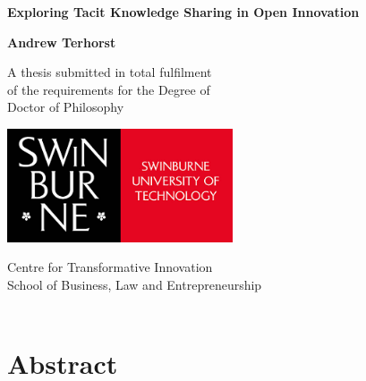 \documentclass[12pt,table,xcdraw]{book}
\renewcommand{\today}{\the\day \ \monthname \ \the\year}
\begin{document}
\frontmatter

\begin{titlepage}
\renewcommand{\today}{\monthname \ \the\year}
\begin{center}
\vspace*{1cm}

\Huge
\textbf{Exploring Tacit Knowledge Sharing in Open Innovation}\\
\vspace{1cm}

\Large
\textbf{Andrew Terhorst}
\vfill

\Large
A thesis submitted in total fulfilment\\
of the requirements for the Degree of \\
Doctor of Philosophy

\vspace{1cm}

\includegraphics[width=0.5\textwidth]{Images/swinburne_university_of_technology.png} 

\vspace{1cm}

\Large
Centre for Transformative Innovation\\
School of Business, Law and Entrepreneurship\\
\today
\end{center}
\end{titlepage}

\doublespacing

\chapter*{Abstract}
\end{document}
